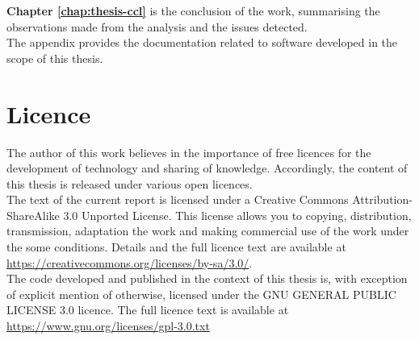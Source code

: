 \textbf{Chapter \ref{chap:thesis-ccl}} is the conclusion of the work, summarising the observations made from the analysis and the issues detected.\\

The appendix provides the documentation related to software developed in the scope of this thesis.

\section*{Licence}

The author of this work believes in the importance of free licences for the development of technology and sharing of knowledge.
Accordingly, the content of this thesis is released under various open licences.\\

The text of the current report is licensed under a Creative Commons Attribution-ShareAlike 3.0 Unported License.
This license allows you to copying, distribution, transmission, adaptation the work and making commercial use of the work under the some conditions.
Details and the full licence text are available at \url{https://creativecommons.org/licenses/by-sa/3.0/}.\\

The code developed and published in the context of this thesis is, with exception of explicit mention of otherwise, licensed under the GNU GENERAL PUBLIC LICENSE 3.0 licence. The full licence text is available at \url{https://www.gnu.org/licenses/gpl-3.0.txt}

